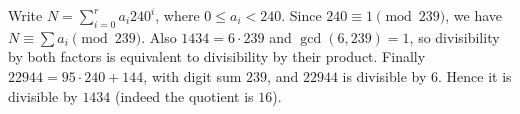 Write $N=\sum_{i=0}^r a_i240^i$, where $0\le a_i<240$. Since $240\equiv1\pmod{239}$, we have $N\equiv\sum a_i\pmod{239}$. Also $1434=6\cdot239$ and $\gcd(6,239)=1$, so divisibility by both factors is equivalent to divisibility by their product. Finally $22944=95\cdot240+144$, with digit sum $239$, and $22944$ is divisible by $6$. Hence it is divisible by $1434$ (indeed the quotient is $16$).
